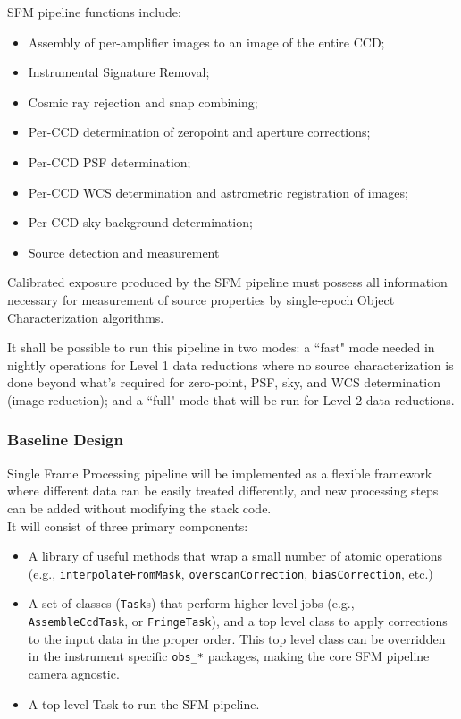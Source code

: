 SFM pipeline functions include:
%
\begin{itemize}
    \item Assembly of per-amplifier images to an image of the entire CCD;
    \item Instrumental Signature Removal;
    \item Cosmic ray rejection and snap combining;
    \item Per-CCD determination of zeropoint and aperture corrections;
    \item Per-CCD PSF determination;
    \item Per-CCD WCS determination and astrometric registration of images;
    \item Per-CCD sky background determination;
    \item Source detection and measurement
\end{itemize}

Calibrated exposure produced by the SFM pipeline must possess all information necessary for measurement of source properties by single-epoch Object Characterization algorithms.

It shall be possible to run this pipeline in two modes: a ``fast" mode needed in nightly operations for Level 1 data reductions where no source characterization is done beyond what's required for zero-point, PSF, sky, and WCS determination (image reduction); and a ``full" mode that will be run for Level 2 data reductions.

\subsubsection{Baseline Design}

Single Frame Processing pipeline will be implemented as a flexible framework where different data can be easily treated differently, and new processing steps can be added without modifying the stack code.
\\

It will consist of three primary components:
%
\begin{itemize}
    \item A library of useful methods that wrap a small number of atomic operations (e.g., {\tt interpolateFromMask}, {\tt overscanCorrection}, {\tt biasCorrection}, etc.) %
    \item A set of classes ({\tt Task}s) that perform higher level jobs
    (e.g., {\tt AssembleCcdTask}, or {\tt FringeTask}), and a top level class to apply corrections to the input data in the proper order. This top level class can be overridden in the instrument specific {\tt obs\_*} packages, making the core SFM pipeline camera agnostic.
    \item A top-level Task to run the SFM pipeline.
\end{itemize}

